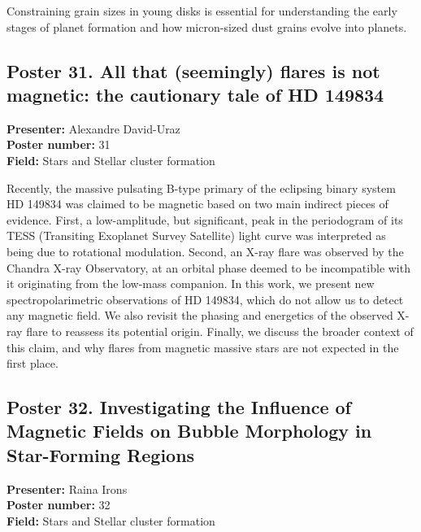 Constraining grain sizes in young disks is essential for understanding the early stages of planet formation and how micron-sized dust grains evolve into planets.

\hypertarget{poster-abstract-talk-220}{}\label{poster-abstract-page-talk-220}
\subsection*{Poster 31. All that (seemingly) flares is not magnetic: the cautionary tale of HD 149834}
\textbf{Presenter:} Alexandre David-Uraz\\
\textbf{Poster number:} 31\\
\textbf{Field:} Stars and Stellar cluster formation

Recently, the massive pulsating B-type primary of the eclipsing binary system HD 149834 was claimed to be magnetic based on two main indirect pieces of evidence. First, a low-amplitude, but significant, peak in the periodogram of its TESS (Transiting Exoplanet Survey Satellite) light curve was interpreted as being due to rotational modulation. Second, an X-ray flare was observed by the Chandra X-ray Observatory, at an orbital phase deemed to be incompatible with it originating from the low-mass companion. In this work, we present new spectropolarimetric observations of HD 149834, which do not allow us to detect any magnetic field. We also revisit the phasing and energetics of the observed X-ray flare to reassess its potential origin. Finally, we discuss the broader context of this claim, and why flares from magnetic massive stars are not expected in the first place.

\hypertarget{poster-abstract-talk-331}{}\label{poster-abstract-page-talk-331}
\subsection*{Poster 32. Investigating the Influence of Magnetic Fields on Bubble Morphology in Star-Forming Regions}
\textbf{Presenter:} Raina Irons\\
\textbf{Poster number:} 32\\
\textbf{Field:} Stars and Stellar cluster formation

